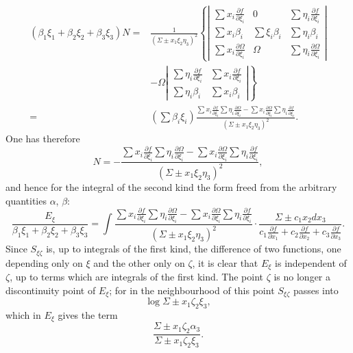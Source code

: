 \documentclass[10pt]{article}
\begin{document}
\[
\begin{aligned}
(\beta_1\xi_1+\beta_2\xi_2+\beta_3\xi_3)N
={}&\frac{1}{(\Sigma\pm x_1\xi_2\eta_3)^2}
\left\{
\left|\begin{array}{ccc}
\sum x_i\frac{\partial f}{\partial \xi_i}&0&\sum \eta_i\frac{\partial f}{\partial \xi_i}\\
\sum x_i\beta_i&\sum \xi_i\beta_i&\sum \eta_i\beta_i\\
\sum x_i\frac{\partial\Omega}{\partial \xi_i}&\Omega&\sum \eta_i\frac{\partial\Omega}{\partial \xi_i}
\end{array}\right|
\right.\\
&\left.
-\Omega
\left|\begin{array}{cc}
\sum \eta_i\frac{\partial f}{\partial \xi_i}&\sum x_i\frac{\partial f}{\partial \xi_i}\\
\sum \eta_i\beta_i&\sum x_i\beta_i
\end{array}\right|
\right\}\\
={}&(\sum\beta_i\xi_i)
\frac{\sum x_i\frac{\partial f}{\partial \xi_i}\sum \eta_i\frac{\partial\Omega}{\partial \xi_i}
-\sum x_i\frac{\partial\Omega}{\partial \xi_i}\sum \eta_i\frac{\partial f}{\partial \xi_i}}{(\Sigma\pm x_1\xi_2\eta_3)^2}.
\end{aligned}
\]
One has therefore
\[
N=-\frac{\sum x_i\frac{\partial f}{\partial \xi_i}\sum \eta_i\frac{\partial\Omega}{\partial \xi_i}
-\sum x_i\frac{\partial\Omega}{\partial \xi_i}\sum \eta_i\frac{\partial f}{\partial \xi_i}}{(\Sigma\pm x_1\xi_2\eta_3)^2},
\]
and hence for the integral of the second kind the form freed from the arbitrary quantities $\alpha$, $\beta$:
\[
\frac{E_\xi}{\beta_1\xi_1+\beta_2\xi_2+\beta_3\xi_3}=\int
\frac{\sum x_i\frac{\partial f}{\partial \xi_i}\sum \eta_i\frac{\partial\Omega}{\partial \xi_i}
-\sum x_i\frac{\partial\Omega}{\partial \xi_i}\sum \eta_i\frac{\partial f}{\partial \xi_i}}{(\Sigma\pm x_1\xi_2\eta_3)^2}
\cdot
\frac{\Sigma\pm c_1x_2dx_3}{c_1\frac{\partial f}{\partial x_1}+c_2\frac{\partial f}{\partial x_2}+c_3\frac{\partial f}{\partial x_3}}.
\]
Since $S_{\xi\zeta}$ is, up to integrals of the first kind, the difference of two functions, one depending only on $\xi$ and the other only on $\zeta$, it is clear that $E_\xi$ is independent of $\zeta$, up to terms which are integrals of the first kind. The point $\zeta$ is no longer a discontinuity point of $E_\xi$; for in the neighbourhood of this point $S_{\xi\zeta}$ passes into
\[
\log\Sigma\pm x_1\zeta_2\xi_3,
\]
which in $E_\xi$ gives the term
\[
\frac{\Sigma\pm x_1\zeta_2\alpha_3}{\Sigma\pm x_1\zeta_2\xi_3}.
\]
\end{document}
